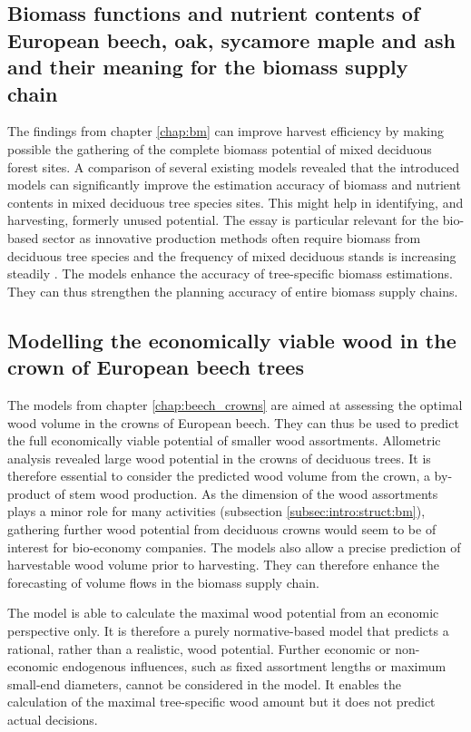 \subsection{Biomass functions and nutrient contents of European beech, oak, sycamore maple and ash and their meaning for the biomass supply chain}
\label{subsec:discussion:struct:bm}
The findings from chapter \ref{chap:bm} can improve harvest efficiency by making possible the gathering of the complete biomass potential of mixed deciduous forest sites. A comparison of several existing models revealed that the introduced models can significantly improve the estimation accuracy of biomass and nutrient contents in mixed deciduous tree species sites. This might help in identifying, and harvesting, formerly unused potential. The essay is particular relevant for the bio-based sector as innovative production methods often require biomass from deciduous tree species \citep[p. 1]{auer_2016} and the frequency of mixed deciduous stands is increasing steadily \citep{ti_2014}. The models enhance the accuracy of tree-specific biomass estimations. They can thus strengthen the planning accuracy of entire biomass supply chains.

\subsection{Modelling the economically viable wood in the crown of European beech trees}
\label{subsec:discussion:struct:beech_crowns}
The models from chapter \ref{chap:beech_crowns} are aimed at assessing the optimal wood volume in the crowns of European beech. They can thus be used to predict the full economically viable potential of smaller wood assortments. Allometric analysis revealed large wood potential in the crowns of deciduous trees. It is therefore essential to consider the predicted wood volume from the crown, a by-product of stem wood production. As the dimension of the wood assortments plays a minor role for many activities (subsection \ref{subsec:intro:struct:bm}), gathering further wood potential from deciduous crowns would seem to be of interest for bio-economy companies. The models also allow a precise prediction of harvestable wood volume prior to harvesting. They can therefore enhance the forecasting of volume flows in the biomass supply chain.

The model is able to calculate the maximal wood potential from an economic perspective only. It is therefore a purely normative-based model that predicts a rational, rather than a realistic, wood potential. Further economic or non-economic endogenous influences, such as fixed assortment lengths or maximum small-end diameters, cannot be considered in the model. It enables the calculation of the maximal tree-specific wood amount but it does not predict actual decisions.

